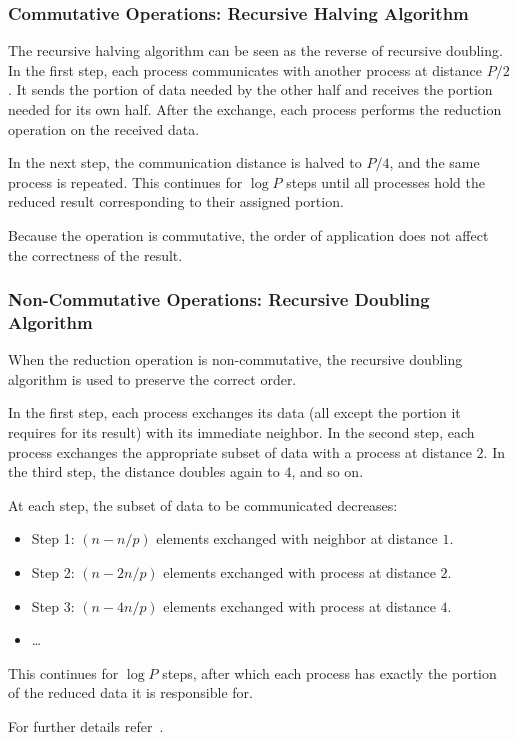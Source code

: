 \documentclass[12pt]{book}
\begin{document}
\subsubsection{Commutative Operations: Recursive Halving Algorithm}
The recursive halving algorithm can be seen as the reverse of recursive doubling.  
In the first step, each process communicates with another process at distance $P/2$.  
It sends the portion of data needed by the other half and receives the portion needed for its own half. After the exchange, each process performs the reduction operation on the received data.  

In the next step, the communication distance is halved to $P/4$, and the same process is repeated.  
This continues for $\log P$ steps until all processes hold the reduced result corresponding to their assigned portion.  

Because the operation is commutative, the order of application does not affect the correctness of the result.

\subsubsection{Non-Commutative Operations: Recursive Doubling Algorithm}
When the reduction operation is non-commutative, the recursive doubling algorithm is used to preserve the correct order.  

In the first step, each process exchanges its data (all except the portion it requires for its result) with its immediate neighbor.  
In the second step, each process exchanges the appropriate subset of data with a process at distance $2$.  
In the third step, the distance doubles again to $4$, and so on.  

At each step, the subset of data to be communicated decreases:  
\begin{itemize}
    \item Step 1: $(n - n/p)$ elements exchanged with neighbor at distance $1$.
    \item Step 2: $(n - 2n/p)$ elements exchanged with process at distance $2$.
    \item Step 3: $(n - 4n/p)$ elements exchanged with process at distance $4$.
    \item \dots
\end{itemize}

This continues for $\log P$ steps, after which each process has exactly the portion of the reduced data it is responsible for.  


For further details refer~\cite{thakur2005optimization}.
\end{document}
